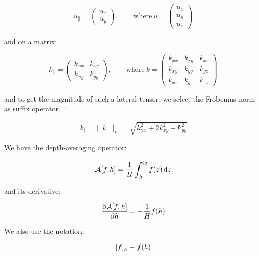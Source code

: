 \documentclass[12pt]{scrartcl}
\newcommand{\aleft}{\mathopen{}\mathclose\bgroup\left}  %
\newcommand{\aright}{\aftergroup\egroup\right}          %
\newcommand{\at}[2]{\left[ #1 \right]_{#2}}             %
\newcommand{\der}[2]{\frac{\partial{#1}}{\partial{#2}}}       %
\newcommand{\intg}[4]{\int_{#1}^{#2}\!{#3}\,\mathrm{d}{#4}}   %
\newcommand{\latr}[1]{{#1}_{\|}}                              %
\newcommand{\magn}[1]{{#1}_|}                                 %
\newcommand{\Hei}{H}        %
\newcommand{\prm}{k}        %
\newcommand{\vel}{u}
\newcommand{\Lev}{\zeta}    %
\newcommand{\Top}{T}        %
\newcommand{\dph}{z}        %
\newcommand{\x}{x}
\newcommand{\y}{y}
\newcommand{\z}{z}
\newcommand{\avg}[2]{\mathcal{A}\aleft[#1, #2\aright]}  %
\newcommand{\f}{f}          %
\newcommand{\h}{h}          %
\newcommand{\LevT}{\Lev_\Top}
\begin{document}
\begin{equation}
\latr{ \vel } = \begin{pmatrix}
\vel_x \\
\vel_y
\end{pmatrix}, \qquad \mathrm{where\ }
\vel = \begin{pmatrix}
\vel_x \\
\vel_y \\
\vel_z
\end{pmatrix}
\end{equation}

and on a matrix:

\begin{equation}
\latr{ \prm } = \begin{pmatrix}
\prm_{\x\x} & \prm_{\x\y} \\
\prm_{\x\y} & \prm_{\y\y}
\end{pmatrix}, \qquad \mathrm{where\ }
\prm = \begin{pmatrix}
\prm_{\x\x} & \prm_{\x\y} & \prm_{\x\z} \\
\prm_{\x\y} & \prm_{\y\y} & \prm_{\y\z} \\
\prm_{\x\z} & \prm_{\y\z} & \prm_{\z\z}
\end{pmatrix}
\end{equation}

and to get the magnitude of such a lateral tensor, we select the Frobenius norm as suffix operator~\( \magn{ \hspace{ 0ex } } \):

\begin{equation}
\magn{ \prm } = \| \latr{ \prm } \|_F = \sqrt{ \prm_{\x\x}^2 + 2\prm_{\x\y}^2 + \prm_{\y\y}^2 }
\end{equation}

We have the depth-averaging operator:

\begin{equation}
\avg{ \f }{ \h } = \frac{ 1 }{ \Hei } \intg{ \h }{ \LevT }{ \f \aleft( \dph \aright) }{ \dph }
\end{equation}

and its derivative:

\begin{equation}
\der{ \avg{ \f }{ \h } }{ \h } = - \frac{ 1 }{ \Hei } \f \aleft( \h \aright)
\end{equation}

We also use the notation:

\begin{equation}
\at{ \f }{ \h } \equiv \f \aleft( \h \aright)
\end{equation}
\end{document}
